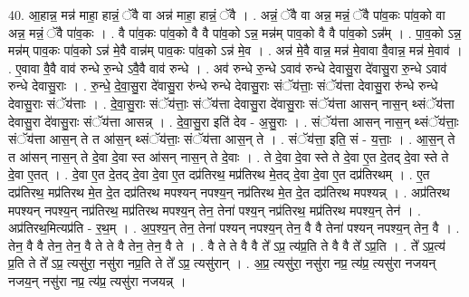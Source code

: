 \documentclass[17pt]{extarticle}
\begin{document}
40. आ॒हान्न॒ मन्न॑ माहा॒ हान्नं॒ ॅवै वा अन्न॑ माहा॒ हान्नं॒ ॅवै । . अन्नं॒ ॅवै वा अन्न॒ मन्नं॒ ॅवै पा॑व॒कः पा॑व॒को वा अन्न॒ मन्नं॒ ॅवै पा॑व॒कः । . वै पा॑व॒कः पा॑व॒को वै वै पा॑व॒को ऽन्न॒ मन्न॑म् पाव॒को वै वै पा॑व॒को ऽन्न᳚म् । . पा॒व॒को ऽन्न॒ मन्न॑म् पाव॒कः पा॑व॒को ऽन्न॑ मे॒वै वान्न॑म् पाव॒कः पा॑व॒को ऽन्न॑ मे॒व । . अन्न॑ मे॒वै वान्न॒ मन्न॑ मे॒वावा वै॒वान्न॒ मन्न॑ मे॒वाव॑ । . ए॒वावा वै॒वै वाव॑ रुन्धे रु॒न्धे ऽवै॒वै वाव॑ रुन्धे । . अव॑ रुन्धे रु॒न्धे ऽवाव॑ रुन्धे देवासु॒रा दे॑वासु॒रा रु॒न्धे ऽवाव॑ रुन्धे देवासु॒राः । . रु॒न्धे॒ दे॒वा॒सु॒रा दे॑वासु॒रा रु॑न्धे रुन्धे देवासु॒राः संॅय॑त्ताः॒ संॅय॑त्ता देवासु॒रा रु॑न्धे रुन्धे देवासु॒राः संॅय॑त्ताः । . दे॒वा॒सु॒राः संॅय॑त्ताः॒ संॅय॑त्ता देवासु॒रा दे॑वासु॒राः संॅय॑त्ता आसन् नास॒न् थ्संॅय॑त्ता देवासु॒रा दे॑वासु॒राः संॅय॑त्ता आसन्न् । . दे॒वा॒सु॒रा इति॑ देव - अ॒सु॒राः । . संॅय॑त्ता आसन् नास॒न् थ्संॅय॑त्ताः॒ संॅय॑त्ता आस॒न् ते त आ॑स॒न् थ्संॅय॑त्ताः॒ संॅय॑त्ता आस॒न् ते । . संॅय॑त्ता॒ इति॒ सं - य॒त्ताः॒ । . आ॒स॒न् ते त आ॑सन् नास॒न् ते दे॒वा दे॒वा स्त आ॑सन् नास॒न् ते दे॒वाः । . ते दे॒वा दे॒वा स्ते ते दे॒वा ए॒त दे॒तद् दे॒वा स्ते ते दे॒वा ए॒तत् । . दे॒वा ए॒त दे॒तद् दे॒वा दे॒वा ए॒त दप्र॑तिरथ॒ मप्र॑तिरथ मे॒तद् दे॒वा दे॒वा ए॒त दप्र॑तिरथम् । . ए॒त दप्र॑तिरथ॒ मप्र॑तिरथ मे॒त दे॒त दप्र॑तिरथ मपश्यन् नपश्य॒न् नप्र॑तिरथ मे॒त दे॒त दप्र॑तिरथ मपश्यन्न् । . अप्र॑तिरथ मपश्यन् नपश्य॒न् नप्र॑तिरथ॒ मप्र॑तिरथ मपश्य॒न् तेन॒ तेना॑ पश्य॒न् नप्र॑तिरथ॒ मप्र॑तिरथ मपश्य॒न् तेन॑ । . अप्र॑तिरथ॒मित्यप्र॑ति - र॒थ॒म् । . अ॒प॒श्य॒न् तेन॒ तेना॑ पश्यन् नपश्य॒न् तेन॒ वै वै तेना॑ पश्यन् नपश्य॒न् तेन॒ वै । . तेन॒ वै वै तेन॒ तेन॒ वै ते ते वै तेन॒ तेन॒ वै ते । . वै ते ते वै वै ते᳚ ऽप्र॒ त्य॑प्र॒ति ते वै वै ते᳚ ऽप्र॒ति । . ते᳚ ऽप्र॒त्य॑ प्र॒ति ते ते᳚ ऽप्र॒ त्यसु॑रा॒ नसु॑रा नप्र॒ति ते ते᳚ ऽप्र॒ त्यसु॑रान् । . अ॒प्र॒ त्यसु॑रा॒ नसु॑रा नप्र॒ त्य॑प्र॒ त्यसु॑रा नजयन् नजय॒न् नसु॑रा नप्र॒ त्य॑प्र॒ त्यसु॑रा नजयन्न् । \newline
\pagebreak
{}
\end{document}
